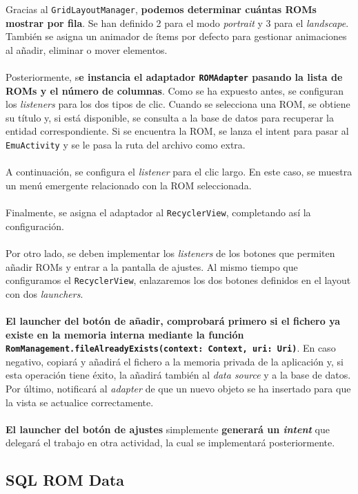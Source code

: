 Gracias al \texttt{GridLayoutManager}, \textbf{podemos determinar cuántas ROMs mostrar por fila}. Se han definido 2 para el modo \textit{portrait} y 3 para el \textit{landscape}. También se asigna un animador de ítems por defecto para gestionar animaciones al añadir, eliminar o mover elementos.
\\\\
Posteriormente, s\textbf{e instancia el adaptador \texttt{ROMAdapter} pasando la lista de ROMs y el número de columnas}. Como se ha expuesto antes, se configuran los \textit{listeners} para los dos tipos de clic. Cuando se selecciona una ROM, se obtiene su título y, si está disponible, se consulta a la base de datos para recuperar la entidad correspondiente. Si se encuentra la ROM, se lanza el intent para pasar al \texttt{EmuActivity} y se le pasa la ruta del archivo como extra.
\\\\
A continuación, se configura el \textit{listener} para el clic largo. En este caso, se muestra un menú emergente relacionado con la ROM seleccionada. 
\\\\
Finalmente, se asigna el adaptador al \texttt{RecyclerView}, completando así la configuración.
\\\\
Por otro lado, se deben implementar los \textit{listeners} de los botones que permiten añadir ROMs y entrar a la pantalla de ajustes. Al mismo tiempo que configuramos el \texttt{RecyclerView}, enlazaremos los dos botones definidos en el layout con dos \textit{launchers}.
\\\\
\textbf{El launcher del botón de añadir, comprobará primero si el fichero ya existe en la memoria interna mediante la función \texttt{RomManagement.fileAlreadyExists(context: Context, uri: Uri)}}. En caso negativo, copiará y añadirá el fichero a la memoria privada de la aplicación y, si esta operación tiene éxito, la añadirá también al \textit{data source} y a la base de datos. Por último, notificará al \textit{adapter} de que un nuevo objeto se ha insertado para que la vista se actualice correctamente.
\\\\
\textbf{El launcher del botón de ajustes} simplemente \textbf{generará un \textit{intent}} que delegará el trabajo en otra actividad, la cual se implementará posteriormente.

\subsection{SQL ROM Data}

